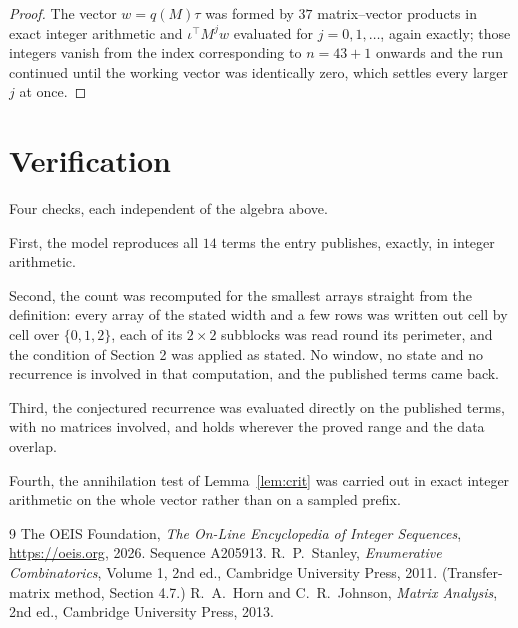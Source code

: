 \documentclass[11pt,a4paper]{article}
\theoremstyle{plain}
\theoremstyle{definition}
\begin{document}
\begin{proof}
The vector $w=q(M)\tau$ was formed by $37$ matrix--vector products in exact integer
arithmetic and $\iota^{\!\top}M^{j}w$ evaluated for $j=0,1,\dots$, again exactly; those
integers vanish from the index corresponding to $n=43+1$ onwards and the run continued
until the working vector was identically zero, which settles every larger $j$ at once.
\end{proof}

\section{Verification}

Four checks, each independent of the algebra above.

First, the model reproduces all $14$ terms the entry publishes, exactly, in integer
arithmetic.

Second, the count was recomputed for the smallest arrays straight from the definition: every
array of the stated width and a few rows was written out cell by cell over $\{0,1,2\}$, each of
its $2\times2$ subblocks was read round its perimeter, and the condition of Section 2 was
applied as stated. No window, no state and no recurrence is involved in that computation, and
the published terms came back.

Third, the conjectured recurrence was evaluated directly on the published terms, with no
matrices involved, and holds wherever the proved range and the data overlap.

Fourth, the annihilation test of Lemma~\ref{lem:crit} was carried out in exact integer
arithmetic on the whole vector rather than on a sampled prefix.

\begin{thebibliography}{9}
 The OEIS Foundation, \emph{The On-Line Encyclopedia of Integer
Sequences}, \url{https://oeis.org}, 2026. Sequence A205913.
 R.~P.~Stanley, \emph{Enumerative Combinatorics}, Volume 1, 2nd ed.,
Cambridge University Press, 2011. (Transfer-matrix method, Section 4.7.)
 R.~A.~Horn and C.~R.~Johnson, \emph{Matrix Analysis}, 2nd ed., Cambridge
University Press, 2013.
\end{thebibliography}
\end{document}
